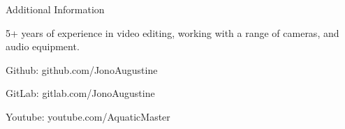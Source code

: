 \documentclass{resume} %
\begin{document}
\begin{rSection}{Additional Information} \itemsep -3pt
\item 5+ years of experience in video editing, working with a range of cameras, and audio equipment.
\item Github: github.com/JonoAugustine
\item GitLab: gitlab.com/JonoAugustine
\item Youtube: youtube.com/AquaticMaster

\end{rSection}
\end{document}
